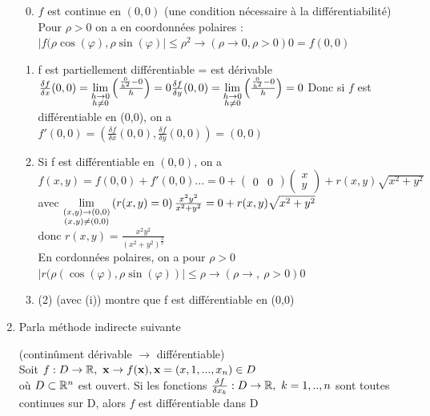 \documentclass[12pt,a4paper]{article}
\begin{document}
\begin{enumerate}[label=\Alph*.]
	\begin{enumerate}%
		\setcounter{enumi}{-1}
		\item 	$f$ est continue en $(0,0)$ (une condition nécessaire à la différentiabilité)\\
				Pour $\rho > 0$ on a en coordonnées polaires :\\
				$| f(\rho \cos(\varphi), \rho \sin(\varphi)| \leq \rho^2 \to (\rho \to 0, \rho > 0) 0 = f(0,0)$
		\item f est partiellement différentiable = est dérivable\\
		$\frac{\delta f}{\delta x}(0,0) = \lim\limits_{\substack{h\to 0 \\ h\neq 0}}\left(\frac{\frac{0}{h^2} - 0}{h}\right) = 0\\
		\frac{\delta f}{\delta y}(0,0) = \lim\limits_{\substack{h\to 0 \\ h\neq 0}}\left(\frac{\frac{0}{h^2} - 0}{h}\right) = 0\\
		$ Donc si $f$ est différentiable en (0,0), on a \\
		$f'(0,0) = (\frac{\delta f}{\delta x}(0,0) , \frac{\delta f}{\delta y}(0,0)) = (0,0)$
		\item 	Si f est différentiable en $(0,0)$, on a\\
		$f(x,y) = f(0,0) + f'(0,0)... = 0 + \begin{pmatrix}
		0 & 0
		\end{pmatrix}
		\begin{pmatrix}
		x\\
		y
		\end{pmatrix} + r(x,y)\sqrt{x^2 + y^2}$
			avec $\lim\limits_{\substack{(x,y) \to (0,0) \\ (x,y) \neq (0,0)}}\left(r(x,y) = 0\right)\\
					\frac{x^2y^2}{x^2+y^2} = 0 + r(x,y)\sqrt{x^2+y^2}$\\
					donc $r(x,y) = \frac{x^2y^2}{(x^2+y^2)^{\frac{3}{2}}}$\\
					En cordonnées polaires, on a pour $\rho > 0$\\
					$|r(\rho(\cos(\varphi), \rho \sin(\varphi))| \leq \rho \to (\rho \to,\ \rho > 0) 0$
		\item (2) (avec (i)) montre que f est différentiable en (0,0)
			\end{enumerate}
	\item 	Parla méthode indirecte suivante
			\begin{boite}
				 (continûment dérivable $\to$ différentiable)\\
				Soit $f: D \to \mathbb{R},\ \textbf{x} \to f(\textbf{x}), \textbf{x}= (x,1,...,x_n) \in D$\\
				où $D\subset \mathbb{R}^n$ est ouvert. Si les fonctions $\frac{\delta f}{\delta x_k} : D\to \mathbb{R},\ k=1,..,n$ sont toutes continues sur D, alors $f$ est différentiable dans D

\end{boite}
\end{enumerate}
\end{document}
